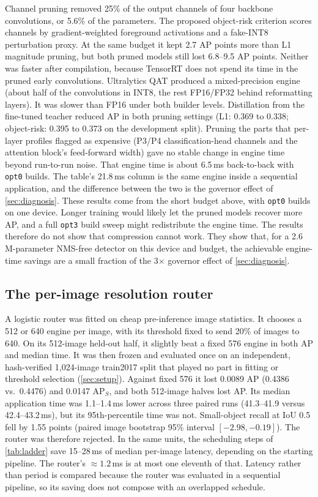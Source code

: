 Channel pruning removed 25\% of the output channels of four backbone
convolutions, or 5.6\% of the parameters. The proposed object-risk
criterion scores channels by gradient-weighted foreground activations
and a fake-INT8 perturbation proxy. At the same budget it kept 2.7 AP
points more than L1 magnitude pruning, but both pruned models still lost
6.8--9.5 AP points. Neither was faster after compilation, because
TensorRT does not spend its time in the pruned early convolutions.
Ultralytics QAT produced a mixed-precision engine (about half of the
convolutions in INT8, the rest FP16/FP32 behind reformatting layers). It
was slower than FP16 under both builder levels. Distillation from the
fine-tuned teacher reduced AP in both pruning settings (L1: 0.369 to
0.338; object-risk: 0.395 to 0.373 on the development split). Pruning
the parts that per-layer profiles flagged as expensive (P3/P4
classification-head channels and the attention block's feed-forward
width) gave no stable change in engine time beyond run-to-run noise.
That engine time is about 6.5\,ms back-to-back with \texttt{opt0}
builds. The table's 21.8\,ms column is the same engine inside a
sequential application, and the difference between the two is the
governor effect of \cref{sec:diagnosis}. These results come from
the short budget above, with \texttt{opt0} builds on one device. Longer
training would likely let the pruned models recover more AP, and a full
\texttt{opt3} build sweep might redistribute the engine time. The
results therefore do not show that compression
cannot work. They show that, for a 2.6\,M-parameter NMS-free detector
on this device and budget, the achievable engine-time savings are a
small fraction of the 3$\times$ governor effect of \cref{sec:diagnosis}.

\subsection{The per-image resolution router}
\label{app:router}

A logistic router was fitted on cheap pre-inference image statistics.
It chooses a 512 or 640 engine per image, with its threshold fixed to
send 20\% of images to 640. On its 512-image held-out half, it slightly
beat a fixed 576 engine in both AP and median time. It was then frozen
and evaluated once on an independent, hash-verified 1,024-image
train2017 split that played no part in fitting or threshold selection
(\cref{sec:setup}). Against fixed 576 it lost 0.0089 AP (0.4386 vs.\
0.4476) and 0.0147 AP$_S$, and both 512-image halves lost AP. Its
median application time was 1.1--1.4\,ms lower across three paired
runs (41.3--41.9 versus 42.4--43.2\,ms), but its 95th-percentile time
was not. Small-object recall at IoU 0.5 fell by 1.55 points (paired
image bootstrap 95\% interval $[-2.98, -0.19]$). The router was
therefore rejected. In the same units, the scheduling steps of
\cref{tab:ladder} save 15--28\,ms of median per-image latency,
depending on the starting pipeline. The router's ${\approx}1.2$\,ms is
at most one eleventh of that. Latency rather than period is compared because
the router was evaluated in a sequential pipeline, so its saving does
not compose with an overlapped schedule.

